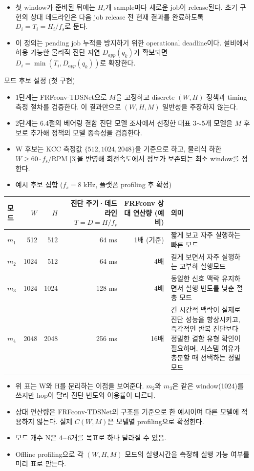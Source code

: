 \documentclass[10pt]{article}
\begin{document}
\begin{itemize}
\item 첫 window가 준비된 뒤에는 $H_i$개 sample마다 새로운 job이 release된다. 초기 구현의 상대 데드라인은 다음 job release 전 현재 결과를 완료하도록 $D_i=T_i=H_i/f_s$로 둔다.
\item 이 정의는 pending job 누적을 방지하기 위한 operational deadline이다. 설비에서 허용 가능한 물리적 진단 지연 $D_{app}(q_k)$가 확보되면 $D_i=\min(T_i,D_{app}(q_k))$로 확장한다.
\end{itemize}
\noindent 모드 후보 설정 (첫 구현)
\begin{itemize}
\item 1단계는 FRFconv-TDSNet으로 $M$을 고정하고 discrete $(W,H)$ 정책과 timing 측정 절차를 검증한다. 이 결과만으로 $(W,H,M)$ 일반성을 주장하지 않는다.
\item 2단계는 6.4절의 베어링 결함 진단 모델 조사에서 선정한 대표 3$\sim$5개 모델을 $M$ 후보로 추가해 정책의 모델 종속성을 검증한다.
\item W 후보는 KCC 측정값 $\{512, 1024, 2048\}$을 기준으로 하고, 물리식 하한 $W \ge 60 \cdot f_s/\mathrm{RPM}$ [3]을 반영해 회전속도에서 정보가 보존되는 최소 window를 정한다.
\item 예시 후보 집합 ($f_s = 8$ kHz, 플랫폼 profiling 후 확정)
\end{itemize}
\begin{center}\footnotesize
\begin{tabular}{@{}lrrrrL{5.8cm}@{}}
\toprule
모드 & $W$ & $H$ & 진단 주기·데드라인 $T=D=H/f_s$ & FRFconv 상대 연산량 (예비) & 의미 \\ \midrule
$m_1$ & 512 & 512 & 64 ms & 1배 (기준) & 짧게 보고 자주 실행하는 빠른 모드 \\
$m_2$ & 1024 & 512 & 64 ms & 4배 & 길게 보면서 자주 실행하는 고부하 실행모드 \\
$m_3$ & 1024 & 1024 & 128 ms & 4배 & 동일한 신호 맥락 유지하면서 실행 빈도를 낮춘 절충 모드 \\
$m_4$ & 2048 & 2048 & 256 ms & 16배 & 긴 시간적 맥락이 실제로 진단 성능을 향상시키고, 즉각적인 반복 진단보다 정밀한 결함 유형 확인이 필요하며, 시스템 여유가 충분할 때 선택하는 정밀 모드 \\
\bottomrule
\end{tabular}
\end{center}
\begin{itemize}
\item 위 표는 W와 H를 분리하는 이점을 보여준다. $m_2$와 $m_3$은 같은 window(1024)를 쓰지만 hop이 달라 진단 빈도와 이용률이 다르다.
\item 상대 연산량은 FRFconv-TDSNet의 구조를 기준으로 한 예시이며 다른 모델에 적용하지 않는다. 실제 $C(W,M)$은 모델별 profiling으로 확정한다.
\item 모드 개수 N은 4$\sim$6개를 목표로 하나 달라질 수 있음.
\item Offline profiling으로 각 $(W,H,M)$ 모드의 실행시간을 측정해 실행 가능 여부를 미리 표로 만든다.
\end{itemize}
\end{document}
